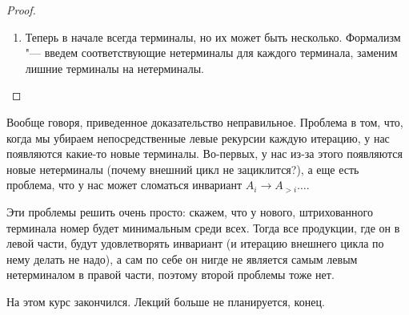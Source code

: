\begin{proof}
\begin{enumerate}
\item
Теперь в начале всегда терминалы, но их может быть несколько.
Формализм "--- введем соответствующие нетерминалы для каждого терминала, заменим лишние терминалы на нетерминалы.     

\end{enumerate}
\end{proof}
\begin{Rem}
Вообще говоря, приведенное доказательство неправильное.
Проблема в том, что, когда мы убираем непосредственные левые рекурсии каждую итерацию, у нас появляются какие-то новые терминалы.
Во-первых, у нас из-за этого появляются новые нетерминалы (почему внешний цикл не зациклится?), а еще есть проблема, что у нас может сломаться инвариант $A_i \to A_{>i} \dots$. 

Эти проблемы решить очень просто: скажем, что у нового, штрихованного терминала номер будет минимальным среди всех. 
Тогда все продукции, где он в левой части, будут удовлетворять инвариант (и итерацию внешнего цикла по нему делать не надо), а сам по себе он нигде не является самым левым нетерминалом в правой части, поэтому второй проблемы тоже нет.
\end{Rem}
На этом курс закончился. Лекций больше не планируется, конец.

